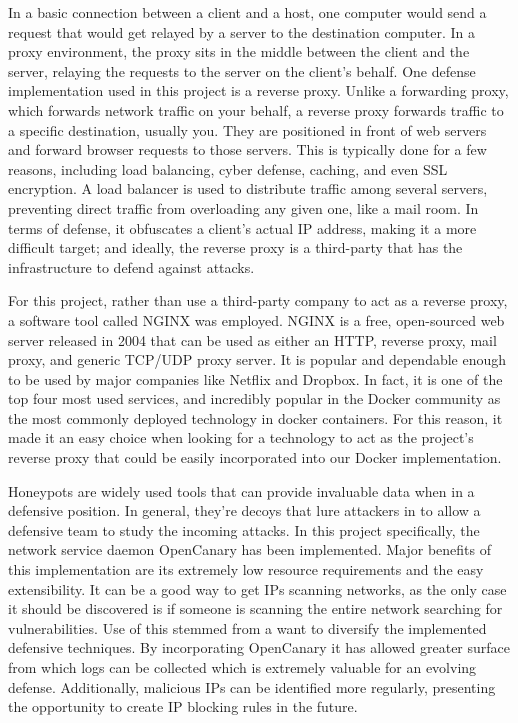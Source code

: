 	In a basic connection between a client and a host, one computer would send a request that would get relayed by a server to the destination computer. In a proxy environment, the proxy sits in the middle between the client and the server, relaying the requests to the server on the client's behalf. One defense implementation used in this project is a reverse proxy. Unlike a forwarding proxy, which forwards network traffic on your behalf, a reverse proxy forwards traffic to a specific destination, usually you. They are positioned in front of web servers and forward browser requests to those servers. This is typically done for a few reasons, including load balancing, cyber defense, caching, and even SSL encryption\cite{CloudFlare_2024j}. A load balancer is used to distribute traffic among several servers, preventing direct traffic from overloading any given one, like a mail room. In terms of defense, it obfuscates a client's actual IP address, making it a more difficult target; and ideally, the reverse proxy is a third-party that has the infrastructure to defend against attacks. 

	For this project, rather than use a third-party company to act as a reverse proxy, a software tool called NGINX was employed. NGINX is a free, open-sourced web server released in 2004 that can be used as either an HTTP, reverse proxy, mail proxy, and generic TCP/UDP proxy server. It is popular and dependable enough to be used by major companies like Netflix and Dropbox. In fact, it is one of the top four most used services, and incredibly popular in the Docker community as the most commonly deployed technology in docker containers\cite{wikiNginx_2024m}. For this reason, it made it an easy choice when looking for a technology to act as the project's reverse proxy that could be easily incorporated into our Docker implementation. 

	Honeypots are widely used tools that can provide invaluable data when in a defensive position. In general, they’re decoys that lure attackers in to allow a defensive team to study the incoming attacks. In this project specifically, the network service daemon OpenCanary has been implemented\cite{OpenCanary_2024j}. Major benefits of this implementation are its extremely low resource requirements and the easy extensibility. It can be a good way to get IPs scanning networks, as the only case it should be discovered is if someone is scanning the entire network searching for vulnerabilities. Use of this stemmed from a want to diversify the implemented defensive techniques. By incorporating OpenCanary it has allowed greater surface from which logs can be collected which is extremely valuable for an evolving defense. Additionally, malicious IPs can be identified more regularly, presenting the opportunity to create IP blocking rules in the future. 

